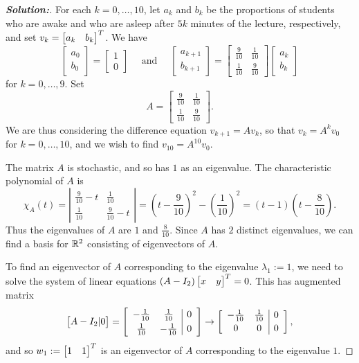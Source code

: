 \documentclass[a4paper]{amsart}
\theoremstyle{definition}
\newenvironment{solution}{\begin{proof}[\textbf{Solution:}] \vphantom{u}}{\end{proof}}
\begin{document}
\begin{solution}
 For each $k = 0, \ldots, 10$, let $a_k$ and $b_k$ be the
 proportions of students who are awake and who are asleep after
 $5k$ minutes of the lecture, respectively, and set $v_k
 = \left[\begin{matrix} a_k & b_k \end{matrix}\right]^T$. We have
     $$
     \left[\begin{array}{cc} a_0\\ b_0 \end{array}\right]
     =\left[\begin{array}{cc} 1\\ 0 \end{array}\right]
    \quad \text{~and~} \quad \left[\begin{array}{cc} a_{k+1}\\ b_{k+1}
    \end{array}\right]=
     \left[\begin{array}{cc} \frac{9}{10} & \frac{1}{10}\\[3pt]
     \frac{1}{10} & \frac{9}{10}
     \end{array}\right] \left[\begin{array}{cc} a_k\\ b_k \end{array}\right] $$
 for $k = 0, \ldots, 9$. Set
 $$ A =
       \left[\begin{array}{cc} \frac{9}{10} & \frac{1}{10}\\[3pt]
     \frac{1}{10} & \frac{9}{10}
     \end{array}\right].$$
 We are thus considering the difference equation $v_{k+1} = Av_k$, so
 that $v_k =
 A^kv_0$ for $k = 0, \ldots, 10$, and we wish to find $v_{10} = A^{10}v_0$.

 The matrix $A$ is stochastic, and so has $1$ as an eigenvalue. The characteristic polynomial of $A$ is
 $$
 \chi_A(t) = \left| \begin{array}{cc} \frac{9}{10} - t & \frac{1}{10}\\[3pt] \frac{1}{10}
 & \frac{9}{10} - t \end{array} \right| =
 {\textstyle \left(t - \frac{9}{10}\right)^2 -
 \left(\frac{1}{10}\right)^2 = (t - 1)\left( t - \frac{8}{10}\right)}.
 $$
 Thus the eigenvalues of $A$ are $1$ and $\frac{8}{10}$. Since $A$ has $2$ distinct
 eigenvalues, we can find a basis for ${\mathbb{R}}^2$ consisting of
 eigenvectors of $A$.

 To find an eigenvector of $A$ corresponding to the eigenvalue $\lambda_1 :=1$,
 we need to solve the system of linear equations
 $(A - I_2)\left[\begin{matrix} x & y \end{matrix}\right]^T = 0$. This has augmented matrix
 $$
 \left[\begin{matrix} A - I_2|0 \end{matrix}\right] = \left[\begin{array}{cc|c}
 - \frac{1}{10} & \frac{1}{10} & 0\\[3pt]
 \frac{1}{10}
 &- \frac{1}{10} & 0\end{array} \right] \to
  \left[\begin{array}{cc|c}- \frac{1}{10} & \frac{1}{10} & 0\\[2pt]
 0
 & 0 & 0\end{array} \right],
 $$
 and so $w_1 :=\left[\begin{matrix} 1 & 1\end{matrix}\right]^T$ is an eigenvector of $A$ corresponding to
 the eigenvalue $1$.


\end{solution}
\end{document}
